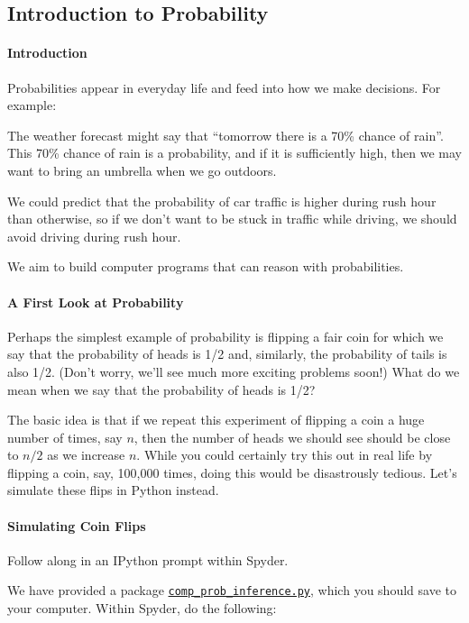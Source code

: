 \documentclass[6008notes.tex]{subfiles}
\begin{document}
\graphicspath{ {images/introprob/} }

\subsection{Introduction to Probability}

\paragraph{Introduction}
Probabilities appear in everyday life and feed into how we make decisions. For example:

The weather forecast might say that ``tomorrow there is a 70\% chance of rain''. This 70\% chance of rain is a probability, and if it is sufficiently high, then we may want to bring an umbrella when we go outdoors.

We could predict that the probability of car traffic is higher during rush hour than otherwise, so if we don't want to be stuck in traffic while driving, we should avoid driving during rush hour.

We aim to build computer programs that can reason with probabilities.

\paragraph{A First Look at Probability}
Perhaps the simplest example of probability is flipping a fair coin for which we say that the probability of heads is 1/2 and, similarly, the probability of tails is also 1/2. (Don't worry, we'll see much more exciting problems soon!) What do we mean when we say that the probability of heads is 1/2?

The basic idea is that if we repeat this experiment of flipping a coin a huge number of times, say $n$, then the number of heads we should see should be close to $n/2$ as we increase $n$. While you could certainly try this out in real life by flipping a coin, say, 100,000 times, doing this would be disastrously tedious. Let's simulate these flips in Python instead.

\paragraph{Simulating Coin Flips}

Follow along in an IPython prompt within Spyder.

We have provided a package \href{https://d37djvu3ytnwxt.cloudfront.net/assets/courseware/v1/710ba23b569da54c14fc614315ced6a1/asset-v1:MITx+6.008.1x+3T2016+type@asset+block/comp_prob_inference.py}{\texttt{comp\_prob\_inference.py}}, which you should save to your computer. Within Spyder, do the following:
\end{document}
